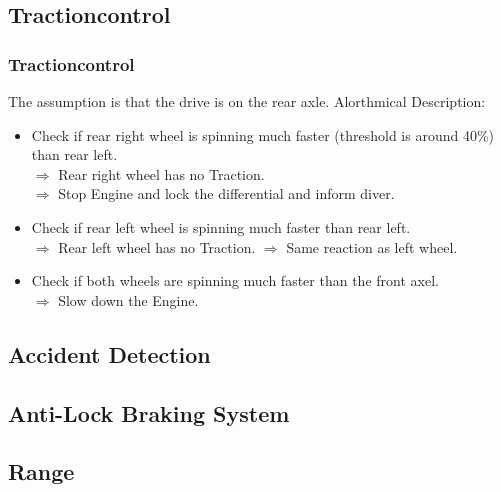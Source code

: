 \documentclass{beamer}
\begin{document}
\subsection{Tractioncontrol}
\begin{frame}
    \frametitle{Tractioncontrol}
    The assumption is that the drive is on the rear axle.
    Alorthmical Description:
    \begin{itemize}
     \item Check if rear right wheel is spinning much faster (threshold is around 40\%) than rear left.\\
     $\Rightarrow$ Rear right wheel has no Traction.\\
     $\Rightarrow$ Stop Engine and lock the differential and inform diver.
     \pause
     \item Check if rear left wheel is spinning much faster than rear left.\\
     $\Rightarrow$ Rear left wheel has no Traction. $\Rightarrow$ Same reaction as left wheel.
     \pause
     \item Check if both wheels are spinning much faster than the front axel.\\
     $\Rightarrow$ Slow down the Engine.
    \end{itemize}
\end{frame}
\subsection{Accident Detection}
\begin{frame}
\end{frame}
\subsection{Anti-Lock Braking System}
\begin{frame}
\end{frame}
\subsection{Range}
\begin{frame}
\end{frame}
\end{document}
